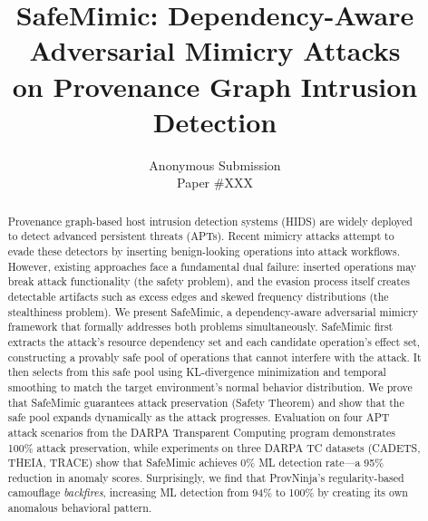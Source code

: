 \documentclass[letterpaper,twocolumn,10pt]{article}
\begin{document}
\title{SafeMimic: Dependency-Aware Adversarial Mimicry Attacks\\
on Provenance Graph Intrusion Detection}

\author{{\rm Anonymous Submission}\\
Paper \#XXX}

\maketitle

\begin{abstract}
Provenance graph-based host intrusion detection systems (HIDS) are widely
deployed to detect advanced persistent threats (APTs). Recent mimicry attacks
attempt to evade these detectors by inserting benign-looking operations into
attack workflows. However, existing approaches face a fundamental dual failure:
inserted operations may break attack functionality (the safety problem), and the
evasion process itself creates detectable artifacts such as excess edges and
skewed frequency distributions (the stealthiness problem). We present
SafeMimic, a dependency-aware adversarial mimicry framework that formally
addresses both problems simultaneously. SafeMimic first extracts the attack's
resource dependency set and each candidate operation's effect set, constructing
a provably safe pool of operations that cannot interfere with the attack. It
then selects from this safe pool using KL-divergence minimization and temporal
smoothing to match the target environment's normal behavior distribution. We
prove that SafeMimic guarantees attack preservation (Safety Theorem) and show
that the safe pool expands dynamically as the attack progresses. Evaluation on
four APT attack scenarios from the DARPA Transparent Computing program demonstrates 100\% attack preservation, while
experiments on three DARPA TC datasets (CADETS, THEIA, TRACE) show that SafeMimic
achieves 0\% ML detection rate---a 95\% reduction in anomaly scores.
Surprisingly, we find that ProvNinja's regularity-based camouflage
\emph{backfires}, increasing ML detection from 94\% to 100\% by creating its
own anomalous behavioral pattern.
\end{abstract}












\end{document}
